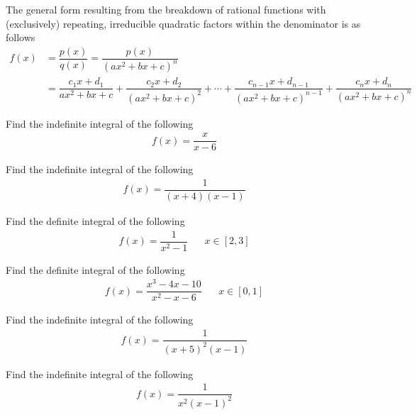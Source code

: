 \begin{example}
The general form resulting from the breakdown of rational functions with (exclusively) repeating, irreducible quadratic factors within the denominator is as follows
\begin{align*}
    f(x) &= \dfrac{p(x)}{q(x)} = \dfrac{p(x)}{(ax^{2} + bx + c)^{n}}\\[2ex]
    &= \dfrac{c_{1}x + d_{1}}{ax^{2} + bx + c} + \dfrac{c_{2}x + d_{2}}{(ax^{2} + bx + c)^{2}} + \cdots + \dfrac{c_{n-1}x + d_{n-1}}{(ax^{2} + bx + c)^{n-1}} + \dfrac{c_{n}x + d_{n}}{(ax^{2} + bx + c)^{n}}
\end{align*}
\end{example}

\begin{exercise}
Find the indefinite integral of the following
\begin{align*}
    f(x) = \dfrac{x}{x-6}
\end{align*}
\end{exercise}

\begin{exercise}
Find the indefinite integral of the following
\begin{align*}
    f(x) = \dfrac{1}{(x+4)(x-1)}
\end{align*}
\end{exercise}

\begin{exercise}
Find the definite integral of the following
\begin{align*}
    f(x) = \dfrac{1}{x^{2} - 1} \hspace{20pt} x \in [2, 3]
\end{align*}
\end{exercise}

\begin{exercise}
Find the definite integral of the following
\begin{align*}
    f(x) = \dfrac{x^{3} - 4x - 10}{x^{2} - x - 6} \hspace{20pt} x \in [0, 1]
\end{align*}
\end{exercise}

\begin{exercise}
Find the indefinite integral of the following
\begin{align*}
    f(x) = \dfrac{1}{(x+5)^{2} (x-1)}
\end{align*}
\end{exercise}

\begin{exercise}
Find the indefinite integral of the following
\begin{align*}
    f(x) = \dfrac{1}{x^{2} (x - 1)^{2}}
\end{align*}
\end{exercise}

